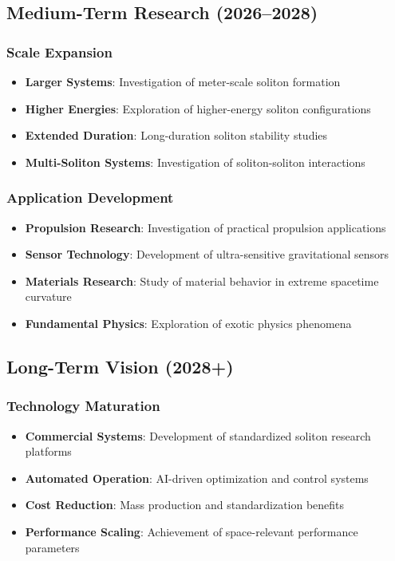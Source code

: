 \documentclass[12pt,a4paper]{article}
\begin{document}
\subsection{Medium-Term Research (2026--2028)}

\subsubsection{Scale Expansion}
\begin{itemize}
\item \textbf{Larger Systems}: Investigation of meter-scale soliton formation
\item \textbf{Higher Energies}: Exploration of higher-energy soliton configurations
\item \textbf{Extended Duration}: Long-duration soliton stability studies
\item \textbf{Multi-Soliton Systems}: Investigation of soliton-soliton interactions
\end{itemize}

\subsubsection{Application Development}
\begin{itemize}
\item \textbf{Propulsion Research}: Investigation of practical propulsion applications
\item \textbf{Sensor Technology}: Development of ultra-sensitive gravitational sensors
\item \textbf{Materials Research}: Study of material behavior in extreme spacetime curvature
\item \textbf{Fundamental Physics}: Exploration of exotic physics phenomena
\end{itemize}

\subsection{Long-Term Vision (2028+)}

\subsubsection{Technology Maturation}
\begin{itemize}
\item \textbf{Commercial Systems}: Development of standardized soliton research platforms
\item \textbf{Automated Operation}: AI-driven optimization and control systems
\item \textbf{Cost Reduction}: Mass production and standardization benefits
\item \textbf{Performance Scaling}: Achievement of space-relevant performance parameters
\end{itemize}
\end{document}
